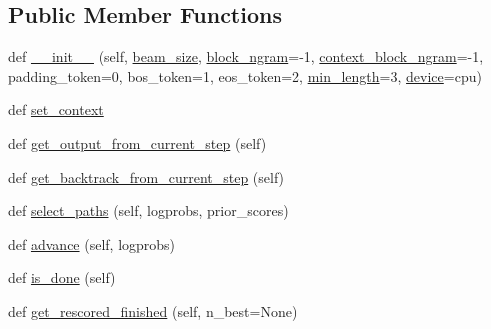\subsection*{Public Member Functions}
\begin{DoxyCompactItemize}
\item 
def \hyperlink{classparlai_1_1core_1_1torch__generator__agent_1_1TreeSearch_a3462e30fc27b2a215773a38cf09f6b46}{\+\_\+\+\_\+init\+\_\+\+\_\+} (self, \hyperlink{classparlai_1_1core_1_1torch__generator__agent_1_1TreeSearch_a2381c33e5233a5f5c1e50c65ab0ee572}{beam\+\_\+size}, \hyperlink{classparlai_1_1core_1_1torch__generator__agent_1_1TreeSearch_a6b27ba18a5e343345ab7319f2ead843d}{block\+\_\+ngram}=-\/1, \hyperlink{classparlai_1_1core_1_1torch__generator__agent_1_1TreeSearch_ab1411b1cb22d74f4682213c487d23898}{context\+\_\+block\+\_\+ngram}=-\/1, padding\+\_\+token=0, bos\+\_\+token=1, eos\+\_\+token=2, \hyperlink{classparlai_1_1core_1_1torch__generator__agent_1_1TreeSearch_a71d6802f40cf025cd5c0242070d78b62}{min\+\_\+length}=3, \hyperlink{classparlai_1_1core_1_1torch__generator__agent_1_1TreeSearch_a37b3f7f827909e3aa2d8e35c32c41e81}{device}=\textquotesingle{}cpu\textquotesingle{})
\item 
def \hyperlink{classparlai_1_1core_1_1torch__generator__agent_1_1TreeSearch_a4706cbec7117a8a2696774c044fc0729}{set\+\_\+context}
\item 
def \hyperlink{classparlai_1_1core_1_1torch__generator__agent_1_1TreeSearch_a929ecbf60f149968caae5a0a6908d67a}{get\+\_\+output\+\_\+from\+\_\+current\+\_\+step} (self)
\item 
def \hyperlink{classparlai_1_1core_1_1torch__generator__agent_1_1TreeSearch_aced42f37b580f876286b5075ba188b2a}{get\+\_\+backtrack\+\_\+from\+\_\+current\+\_\+step} (self)
\item 
def \hyperlink{classparlai_1_1core_1_1torch__generator__agent_1_1TreeSearch_a004609539d0428a9351a991168eb370b}{select\+\_\+paths} (self, logprobs, prior\+\_\+scores)
\item 
def \hyperlink{classparlai_1_1core_1_1torch__generator__agent_1_1TreeSearch_a9f371e57095af5b22ff5eae4c57326c8}{advance} (self, logprobs)
\item 
def \hyperlink{classparlai_1_1core_1_1torch__generator__agent_1_1TreeSearch_a35a3cbfe2df2d02bb46f7e492657afa5}{is\+\_\+done} (self)
\item 
def \hyperlink{classparlai_1_1core_1_1torch__generator__agent_1_1TreeSearch_a4b70f85eec7d81b3a0e1afaea5b09332}{get\+\_\+rescored\+\_\+finished} (self, n\+\_\+best=None)
\end{DoxyCompactItemize}
